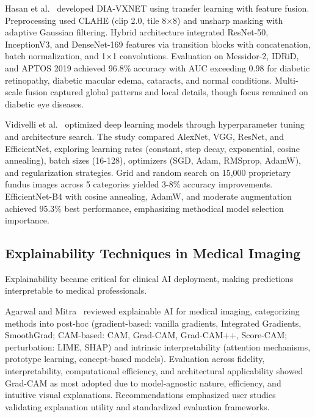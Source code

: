 Hasan et al.~\cite{R6} developed DIA-VXNET using transfer learning with feature fusion. Preprocessing used CLAHE (clip 2.0, tile 8×8) and unsharp masking with adaptive Gaussian filtering. Hybrid architecture integrated ResNet-50, InceptionV3, and DenseNet-169 features via transition blocks with concatenation, batch normalization, and 1×1 convolutions. Evaluation on Messidor-2, IDRiD, and APTOS 2019 achieved 96.8\% accuracy with AUC exceeding 0.98 for diabetic retinopathy, diabetic macular edema, cataracts, and normal conditions. Multi-scale fusion captured global patterns and local details, though focus remained on diabetic eye diseases.

Vidivelli et al.~\cite{R5} optimized deep learning models through hyperparameter tuning and architecture search. The study compared AlexNet, VGG, ResNet, and EfficientNet, exploring learning rates (constant, step decay, exponential, cosine annealing), batch sizes (16-128), optimizers (SGD, Adam, RMSprop, AdamW), and regularization strategies. Grid and random search on 15,000 proprietary fundus images across 5 categories yielded 3-8\% accuracy improvements. EfficientNet-B4 with cosine annealing, AdamW, and moderate augmentation achieved 95.3\% best performance, emphasizing methodical model selection importance.

\subsection{Explainability Techniques in Medical Imaging}

Explainability became critical for clinical AI deployment, making predictions interpretable to medical professionals.

Agarwal and Mitra~\cite{R3} reviewed explainable AI for medical imaging, categorizing methods into post-hoc (gradient-based: vanilla gradients, Integrated Gradients, SmoothGrad; CAM-based: CAM, Grad-CAM, Grad-CAM++, Score-CAM; perturbation: LIME, SHAP) and intrinsic interpretability (attention mechanisms, prototype learning, concept-based models). Evaluation across fidelity, interpretability, computational efficiency, and architectural applicability showed Grad-CAM as most adopted due to model-agnostic nature, efficiency, and intuitive visual explanations. Recommendations emphasized user studies validating explanation utility and standardized evaluation frameworks.

